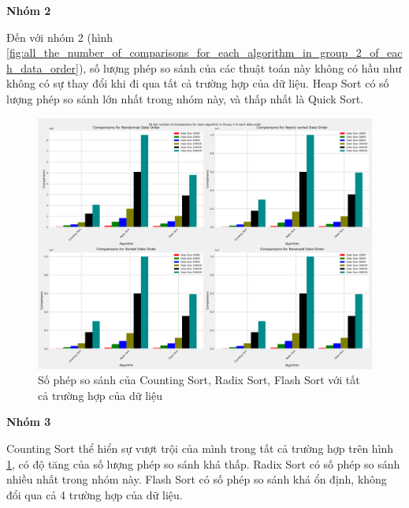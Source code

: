 \textbf{Nhóm 2}

Đến với nhóm 2 (hình \ref{fig:all_the_number_of_comparisons_for_each_algorithm_in_group_2_of_each_data_order}), số lượng phép so sánh của các thuật toán này không có hầu như không có sự thay đổi khi đi qua tất cả trường hợp của dữ liệu. Heap Sort có số lượng phép so sánh lớn nhất trong nhóm này, và thấp nhất là Quick Sort. 




\begin{figure}[H]
    \centering
    \includegraphics[width=\textwidth]{experimental_result/images/all_the_number_of_comparisons_for_each_algorithm_in_group_3_of_each_data_order.png}
    \caption{Số phép so sánh của Counting Sort, Radix Sort, Flash Sort với tất cả trường hợp của dữ liệu}
    \label{fig:all_the_number_of_comparisons_for_each_algorithm_in_group_3_of_each_data_order}
\end{figure}

\textbf{Nhóm 3}

Counting Sort thể hiển sự vượt trội của mình trong tất cả trường hợp trên hình \ref{fig:all_the_number_of_comparisons_for_each_algorithm_in_group_3_of_each_data_order}, có độ tăng của số lượng phép so sánh khá thấp. Radix Sort có số phép so sánh nhiều nhất trong nhóm này. Flash Sort có số phép so sánh khá ổn định, không đổi qua cả 4 trường hợp của dữ liệu.
